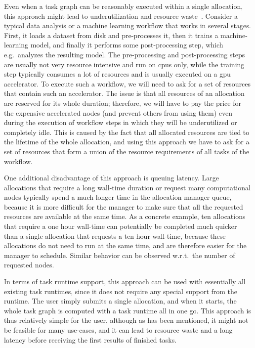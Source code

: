 Even when a task graph can be reasonably executed within a single allocation, this approach might
lead to underutilization and resource waste~\cite{ehpc}. Consider a typical data
analysis or a machine learning workflow that works in several stages. First, it loads a dataset
from disk and pre-processes it, then it trains a machine-learning model, and finally it performs
some post-processing step, which e.g.\ analyzes the resulting model. The pre-processing and
post-processing steps are usually not very resource intensive and run on \glspl{cpu}
only, while the training step typically consumes a lot of resources and is usually executed on a
\gls{gpu} accelerator. To execute such a workflow, we will need to ask for a set
of resources that contain such an accelerator. The issue is that all resources of an allocation are
reserved for its whole duration; therefore, we will have to pay the price for the expensive
accelerated nodes (and prevent others from using them) even during the execution of workflow steps
in which they will be underutilized or completely idle. This is caused by the fact that all
allocated resources are tied to the lifetime of the whole allocation, and using this approach we
have to ask for a set of resources that form a union of the resource requirements of all tasks of
the workflow.

One additional disadvantage of this approach is queuing latency. Large allocations that require a
long wall-time duration or request many computational nodes typically spend a much longer time
in the allocation manager queue, because it is more difficult for the manager to make sure that all
the requested resources are available at the same time. As a concrete example, ten allocations that
require a one hour wall-time can potentially be completed much quicker than a single allocation
that requests a ten hour wall-time, because these allocations do not need to run at the same time,
and are therefore easier for the manager to schedule. Similar behavior can be observed w.r.t.\ the
number of requested nodes.

In terms of task runtime support, this approach can be used with essentially all existing task
runtimes, since it does not require any special support from the runtime. The user simply submits a
single allocation, and when it starts, the whole task graph is computed with a task runtime all in
one go. This approach is thus relatively simple for the user, although as has been mentioned, it
might not be feasible for many use-cases, and it can lead to resource waste and a long latency
before receiving the first results of finished tasks.

